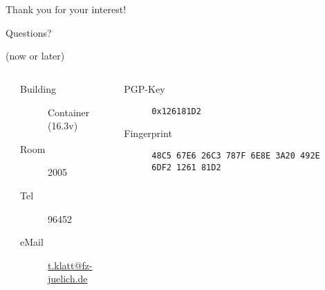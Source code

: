 \documentclass[english,hyperref={pdfpagelabels=false},aspectratio=169]{beamer}
\begin{document}
\begin{frame}
  \frametitle{~}
  \begin{center}
    {\huge Thank you for your interest!}\par
    \bigskip
    \bigskip
    \bigskip
    {\Large Questions?}\par
    {\scriptsize\color{fzjgray50}(now or later)}\par
    \bigskip
    \bigskip
    \begin{columns}
      \tiny
      \begin{column}{0.1\textwidth}
      \end{column}
      \begin{column}{0.4\textwidth}
        \begin{description}
          \item[Building] Container (16.3v)
          \item[Room] 2005
          \item[Tel] 96452
          \item[eMail] \href{mailto:t.klatt@fz-juelich.de}{t.klatt@fz-juelich.de}
        \end{description}
      \end{column}
      \begin{column}{0.38\textwidth}
        \begin{description}
          \item[PGP-Key] \texttt{0x126181D2}
          \item[Fingerprint] \texttt{48C5 67E6 26C3 787F 6E8E 3A20 492E 6DF2 1261 81D2}
        \end{description}
      \end{column}
      \begin{column}{0.12\textwidth}
      \end{column}
    \end{columns}
  \end{center}
\end{frame}
\end{document}
